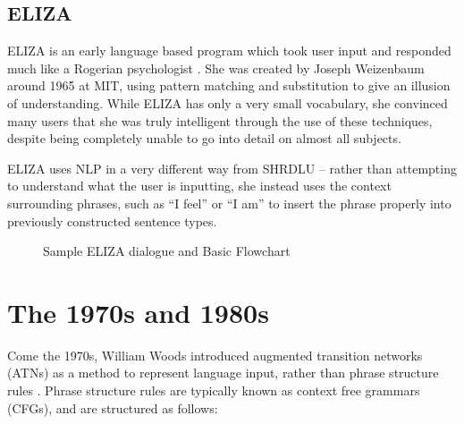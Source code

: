 \subsection{ELIZA}                                                                     
                                                                                          
ELIZA is an early language based program which took user input and responded much like a Rogerian psychologist \cite{Weizenbaum}. She was created by Joseph Weizenbaum around 1965 at MIT, using pattern matching and substitution to give an illusion of understanding. While ELIZA has only a very small vocabulary, she convinced many users that she was truly intelligent through the use of these techniques, despite being completely unable to go into detail on almost all subjects.

ELIZA uses NLP in a very different way from SHRDLU -- rather than attempting to understand what the user is inputting, she instead uses the context surrounding phrases, such as ``I feel'' or ``I am'' to insert the phrase properly into previously constructed sentence types.



\begin{figure}[!ht]                                                                                        
\begin{center}                                                                                             
\end{center}                                                                                               
\caption{Sample ELIZA dialogue and Basic Flowchart}\label{ELIZA}                                                                                     
\end{figure}                                                                                               



\section{The 1970s and 1980s}
Come the 1970s, William Woods introduced augmented transition networks (ATNs) as a method to represent language input, rather than phrase structure rules \cite{Woods}. Phrase structure rules are typically known as context free grammars (CFGs), and are structured as follows:



